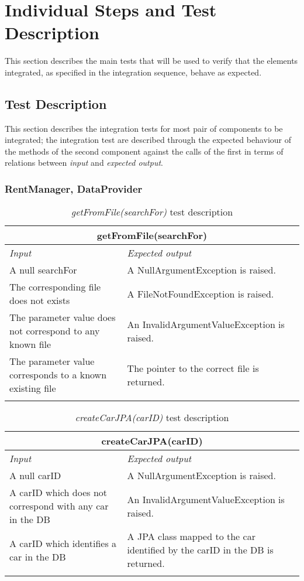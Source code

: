 \section{Individual Steps and Test Description}

This section describes the main tests that will be used to verify that the elements integrated, as specified in the integration sequence, behave as expected. 

\subsection{Test Description}

This section describes the integration tests for most pair of components to be integrated; the integration test are described through the expected behaviour of the methods of the second component against the calls of the first in terms of relations between \emph{input} and \emph{expected output}.

\subsubsection{RentManager, DataProvider}

\begin{longtable}{p{0.4\linewidth}p{0.6\linewidth}}
\multicolumn{2}{c}{\textbf{getFromFile(searchFor)}} \\
\toprule
\emph{Input} & \emph{Expected output} \\
\midrule
A null searchFor & A NullArgumentException is raised.\\
\midrule
The corresponding file does not exists & A FileNotFoundException is raised. \\
\midrule
The parameter value does not correspond to any known file & An InvalidArgumentValueException is raised. \\
\midrule
The parameter value corresponds to a known existing file & The pointer to the correct file is returned. \\
\bottomrule
\caption{\emph{getFromFile(searchFor)} test description}
\end{longtable}

\begin{longtable}{p{0.4\linewidth}p{0.6\linewidth}}
\multicolumn{2}{c}{\textbf{createCarJPA(carID)}} \\
\toprule
\emph{Input} & \emph{Expected output} \\
\midrule
A null carID & A NullArgumentException is raised.\\
\midrule
A carID which does not correspond with any car in the DB & An InvalidArgumentValueException is raised. \\
\midrule
A carID which identifies a car in the DB & A JPA class mapped to the car identified by the carID in the DB is returned. \\
\bottomrule
\caption{\emph{createCarJPA(carID)} test description}
\end{longtable}


